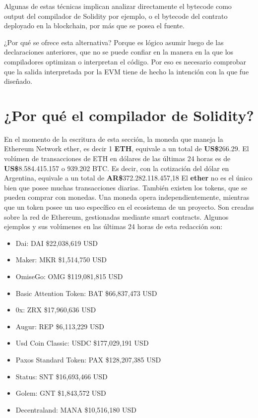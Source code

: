 Algunas de estas técnicas implican analizar directamente el bytecode como output del compilador de Solidity por ejemplo, o el bytecode del contrato deployado en la blockchain, por más que se posea el fuente.

¿Por qué se ofrece esta alternativa? Porque es lógico asumir luego de las declaraciones anteriores, que no se puede confiar en la manera en la que los compiladores optimizan o interpretan el código. Por eso es necesario comprobar que la salida interpretada por la EVM tiene de hecho la intención con la que fue diseñado.

\section{¿Por qué el compilador de Solidity?}
En el momento de la escritura de esta sección, la moneda que maneja la Ethereum Network ether, es decir 1 \textbf{ETH}, equivale a un total de \textbf{US\$}266.29. El volúmen de transacciones de ETH en dólares de las últimas 24 horas es de \textbf{US\$}8.584.415.157 o 939.202 BTC. Es decir, con la cotización del dólar en Argentina, equivale a un total de \textbf{AR\$}372.282.118.457,18\cite{coinmarketcap}
El \textbf{ether} no es el único bien que posee muchas transacciones diarias. También existen los tokens, que se pueden comprar con monedas. Una moneda opera independientemente, mientras que un token posee un uso específico en el ecosistema de un proyecto. Son creadas sobre la red de Ethereum, gestionadas mediante smart contracts. Algunos ejemplos y sus volúmenes en las últimas 24 horas de esta redacción son:

\begin{itemize}
    \item Dai: DAI \$22,038,619 USD 
    \item Maker: MKR \$1,514,750 USD 
    \item OmiseGo: OMG \$119,081,815 USD 
    \item Basic Attention Token: BAT \$66,837,473 USD
    \item 0x: ZRX \$17,960,636 USD 
    \item Augur: REP \$6,113,229 USD
    \item Usd Coin Classic: USDC \$177,029,191 USD
    \item Paxos Standard Token: PAX \$128,207,385 USD
    \item Status: SNT \$16,693,466 USD
    \item Golem: GNT \$1,843,572 USD 
    \item Decentraland: MANA \$10,516,180 USD
\end{itemize}


